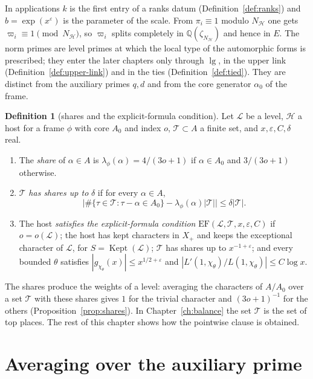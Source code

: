 \documentclass[11pt]{amsbook}
\theoremstyle{plain}
\theoremstyle{definition}
\newtheorem{definition}[theorem]{Definition}
\theoremstyle{remark}
\numberwithin{equation}{section}
\numberwithin{figure}{chapter}
\numberwithin{table}{chapter}
\newcommand{\Q}{\mathbb{Q}}
\newcommand{\eps}{\varepsilon}
\newcommand{\lev}{\mathscr{L}}
\newcommand{\Kept}{\operatorname{Kept}}
\newcommand{\Top}{\mathcal{T}}
\newcommand{\lgv}{\operatorname{lg}}
\begin{document}
In applications $k$ is the first entry of a ranks datum
(Definition~\ref{def:ranks}) and $b=\exp(x^\eps)$ is the parameter of
the scale. From $\pi_i\equiv1$ modulo $N_{\mathcal H}$ one gets
$\varpi_i\equiv1\pmod{N_{\mathcal H}}$, so $\varpi_i$ splits
completely in $\Q(\zeta_{N_{\mathcal H}})$ and hence in $E$. The norm
primes are level primes at which the local type of the automorphic
forms is prescribed; they enter the later chapters only through
$\lgv$, in the upper link (Definition~\ref{def:upper-link}) and in the
ties (Definition~\ref{def:tied}). They are distinct from the auxiliary
primes $q,d$ and from the core generator $\alpha_0$ of the frame.

\begin{definition}[shares and the explicit-formula condition]
\label{def:shares-ef}
Let $\lev$ be a level, $\mathcal H$ a host for a frame $\phi$ with
core $A_0$ and index $o$, $\Top\subset A$ a finite set, and
$x,\eps,C,\delta$ real.
\begin{enumerate}[label=(\arabic*)]
\item The \emph{share} of $\alpha\in A$ is $\lambda_\phi(\alpha)=
4/(3o+1)$ if $\alpha\in A_0$ and $3/(3o+1)$ otherwise.
\item $\Top$ \emph{has shares up to} $\delta$ if for every
$\alpha\in A$,
\[
\bigl|\#\{\tau\in\Top:\tau-\alpha\in A_0\}-\lambda_\phi(\alpha)|\Top|
\bigr|\le\delta|\Top|.
\]
\item The host \emph{satisfies the explicit-formula condition}
$\mathrm{EF}(\lev,\Top,x,\eps,C)$ if $o=o(\lev)$; the host has kept
characters in $X_+$ and keeps the exceptional character of $\lev$,
for $S=\Kept(\lev)$; $\Top$ has shares up to $x^{-1+\eps}$; and every
bounded $\theta$ satisfies $|g_{\chi_\theta}(x)|\le x^{1/2+\eps}$ and
$|L'(1,\chi_\theta)/L(1,\chi_\theta)|\le C\log x$.
\end{enumerate}
\end{definition}

The shares produce the weights of a level: averaging the
characters of $A/A_0$ over a set $\Top$ with these shares gives $1$
for the trivial character and $(3o+1)^{-1}$ for the others
(Proposition~\ref{prop:shares}). In Chapter~\ref{ch:balance} the set
$\Top$ is the set of top places. The rest of this chapter shows how
the pointwise clause is obtained.

\section{Averaging over the auxiliary prime}
\end{document}
